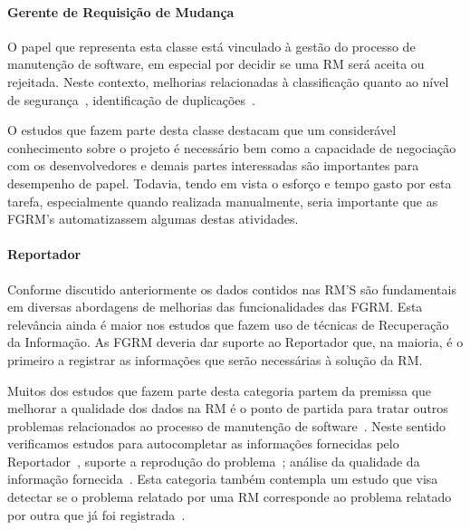 \paragraph{Gerente de Requisição de	Mudança} O papel que representa esta classe
está vinculado à gestão do processo de manutenção de software, em especial por
decidir se uma RM será aceita ou rejeitada. Neste contexto, melhorias
relacionadas à classificação quanto ao nível de
segurança~\cite{gegick2010identifying, zhang2011bug, ValdiviaGarcia:2014:CPB:2597073.2597099}, identificação de
duplicações~\cite{hindle2016contextual, sun2010discriminative, alipour2013contextual, banerjee2012automated}.

O estudos que fazem parte desta classe destacam que um considerável conhecimento
sobre o projeto é necessário bem como  a capacidade de negociação com os
desenvolvedores e demais partes interessadas são importantes para desempenho de
papel. Todavia, tendo em vista o esforço e tempo gasto por esta tarefa,
especialmente quando realizada manualmente, seria importante que as FGRM's
automatizassem algumas destas atividades.

\paragraph{Reportador} Conforme discutido anteriormente os dados contidos nas
RM'S são fundamentais em diversas abordagens de melhorias das funcionalidades
das FGRM\@. Esta relevância ainda é maior nos estudos que fazem uso de técnicas
de Recuperação da Informação. As FGRM deveria dar suporte ao Reportador que, na
maioria, é o primeiro a registrar as informações que serão necessárias à solução
da RM\@.

Muitos dos estudos que fazem parte desta categoria  partem da premissa que
melhorar a qualidade dos dados na RM é o ponto de partida para tratar outros
problemas relacionados ao processo de manutenção de
software~\cite{moran2015auto, Moran:2015:EAA:2786805.2807557, Bettenburg2008a}.
Neste sentido verificamos estudos para autocompletar as informações fornecidas
pelo Reportador~\cite{moran2015auto}, suporte a reprodução do
problema~\cite{Moran:2015:EAA:2786805.2807557}; análise da qualidade da
informação fornecida~\cite{Bettenburg2008a, Tu:2014:MQI:2677832.2677844}. Esta
categoria também contempla um estudo que visa detectar se o problema relatado
por uma RM corresponde ao problema relatado por outra que já foi
registrada~\cite{Thung2014}.

